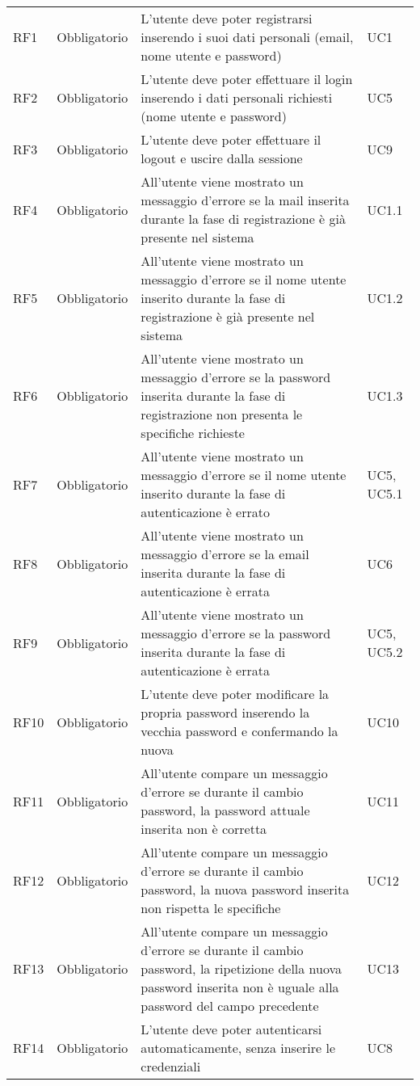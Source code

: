 {\begin{longtable}{C{.257\freewidth} C{.257\freewidth} C{.257\freewidth} C{.257\freewidth}}
      RF1 & Obbligatorio & L'utente deve poter registrarsi inserendo i suoi dati personali (email, nome utente e password) & UC1 \\
      RF2 & Obbligatorio & L'utente deve poter effettuare il login inserendo i dati personali richiesti (nome utente e password) & UC5 \\
      RF3 & Obbligatorio & L'utente deve poter effettuare il logout e uscire dalla sessione & UC9 \\
      RF4 & Obbligatorio & All'utente viene mostrato un messaggio d'errore se la mail inserita durante la fase di registrazione è già presente nel sistema  & UC1.1 \\
      RF5 & Obbligatorio & All'utente viene mostrato un messaggio d'errore se il nome utente inserito durante la fase di registrazione è già presente nel sistema & UC1.2 \\
      RF6 & Obbligatorio & All'utente viene mostrato un messaggio d'errore se la password inserita durante la fase di registrazione non presenta le specifiche richieste & UC1.3 \\
      RF7 & Obbligatorio & All'utente viene mostrato un messaggio d'errore se il nome utente inserito durante la fase di autenticazione è errato & UC5, UC5.1 \\
      RF8 & Obbligatorio & All'utente viene mostrato un messaggio d'errore se la email inserita durante la fase di autenticazione è errata & UC6\\
      RF9 & Obbligatorio & All'utente viene mostrato un messaggio d'errore se la password inserita durante la fase di autenticazione è errata & UC5, UC5.2 \\
      RF10 & Obbligatorio & L'utente deve poter modificare la propria password inserendo la vecchia password e confermando la nuova & UC10 \\
      RF11 & Obbligatorio & All'utente compare un messaggio d'errore se durante il cambio password, la password attuale inserita non è corretta & UC11 \\
      RF12 & Obbligatorio & All'utente compare un messaggio d'errore se durante il cambio password, la nuova password inserita non rispetta le specifiche & UC12 \\
      RF13 & Obbligatorio & All'utente compare un messaggio d'errore se durante il cambio password, la ripetizione della nuova password inserita non è uguale alla password del campo precedente & UC13 \\
      RF14 & Obbligatorio & L'utente deve poter autenticarsi automaticamente, senza inserire le credenziali & UC8\\

\end{longtable}}
